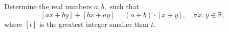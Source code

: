 Determine the real numbers $ a,b, $ such that
$$ [ax+by]+[bx+ay]=(a+b)\cdot [x+y],\quad\forall x,y\in\mathbb{R} , $$where $ [t] $ is the greatest integer smaller than $ t. $